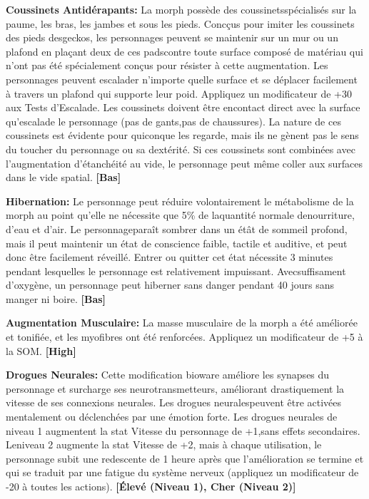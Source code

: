 {{\textbf{Coussinets Antidérapants:} La morph possède des coussinetsspécialisés sur la paume, les bras, les jambes et sous les pieds. Concçus pour imiter les coussinets des pieds desgeckos, les personnages peuvent se maintenir sur un mur ou un plafond en plaçant deux de ces padscontre toute surface composé de matériau qui n'ont pas été spécialement conçus pour résister à cette augmentation. Les personnages peuvent escalader n'importe quelle surface et se déplacer facilement à travers un plafond qui supporte leur poid. Appliquez un modificateur de +30 aux Tests d'Escalade. Les coussinets doivent être encontact direct avec la surface qu'escalade le personnage (pas de gants,pas de chaussures). La nature de ces coussinets est évidente pour quiconque les regarde, mais ils ne gènent pas le sens du toucher du personnage ou sa dextérité. Si ces coussinets sont combinées avec l'augmentation d'étanchéité au vide, le personnage peut même coller aux surfaces dans le vide spatial. \textbf{[Bas]} 

\textbf{Hibernation:} Le personnage peut réduire volontairement le métabolisme de la morph au point qu'elle ne nécessite que 5\% de laquantité normale denourriture, d'eau et d'air. Le personnageparaît sombrer dans un étât de sommeil profond, mais il peut maintenir un état de conscience faible, tactile et auditive, et peut donc être facilement réveillé. Entrer ou quitter cet état nécessite 3 minutes pendant lesquelles le personnage est relativement impuissant. Avecsuffisament d'oxygène, un personnage peut hiberner sans danger pendant 40 jours sans manger ni boire. \textbf{[Bas]} 

\textbf{Augmentation Musculaire:} La masse musculaire de la morph a été améliorée et tonifiée, et les myofibres ont été renforcées. Appliquez un modificateur de +5 à la SOM. \textbf{[High]} 

\textbf{Drogues Neurales:} Cette modification bioware améliore les synapses du personnage et surcharge ses neurotransmetteurs, améliorant drastiquement la vitesse de ses connexions neurales. Les drogues neuralespeuvent être activées mentalement ou déclenchées par une émotion forte. Les drogues neurales de niveau 1 augmentent la stat Vitesse du personnage de +1,sans effets secondaires. Leniveau 2 augmente la stat Vitesse de +2, mais à chaque utilisation, le personnage subit une redescente de 1 heure après que l'amélioration se termine et qui se traduit par une fatigue du système nerveux (appliquez un modificateur de -20 à toutes les actions). \textbf{[Élevé (Niveau 1), Cher (Niveau 2)]} 

}}
